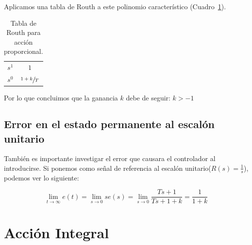             Aplicamos una tabla de Routh a este polinomio característico (Cuadro~\ref{tab:AccionProporcional}).

            \begin{table}[htbp]
                \centering
                \begin{tabular}{c|c}
                $s^1$ & $1$ \\
                $s^0$ & $\sfrac{1+k}{T}$
                \end{tabular}
                \caption{\label{tab:AccionProporcional}Tabla de Routh para acción proporcional.}
            \end{table}

Por lo que concluimos que la ganancia $k$ debe de seguir: $k>-1$


        \subsection{Error en el estado permanente al escalón unitario}
            También es importante investigar el error que causara el controlador al introducirse. Si ponemos como señal de referencia al escalón unitario($R(s) = \frac{1}{s}$), podemos ver lo siguiente:

            \begin{equation*}
                \displaystyle \lim_{t \to \infty} e(t) = \lim_{s \to 0} s e(s) = \lim_{s \to 0} \frac{Ts + 1}{Ts + 1 + k} = \frac{1}{1 + k}
            \end{equation*}



    \newpage
    \section{Acción Integral}

